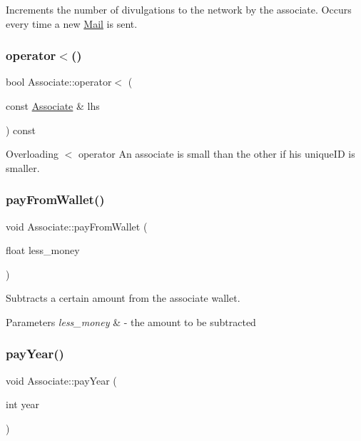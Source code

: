 Increments the number of divulgations to the network by the associate. Occurs every time a new \hyperlink{classMail}{Mail} is sent. 

\mbox{\label{classAssociate_a169cbe6746295386254610c7c9811085}} 
\subsubsection{\texorpdfstring{operator$<$()}{operator<()}}
{\footnotesize\ttfamily bool Associate\+::operator$<$ (\begin{DoxyParamCaption}\item[{const \hyperlink{classAssociate}{Associate} \&}]{lhs }\end{DoxyParamCaption}) const}



Overloading $<$ operator An associate is small than the other if his unique\+ID is smaller. 

\mbox{\label{classAssociate_a81f6e7e09ce00a9bf2a805d47d542b90}} 
\subsubsection{\texorpdfstring{pay\+From\+Wallet()}{payFromWallet()}}
{\footnotesize\ttfamily void Associate\+::pay\+From\+Wallet (\begin{DoxyParamCaption}\item[{float}]{less\+\_\+money }\end{DoxyParamCaption})}



Subtracts a certain amount from the associate wallet. 


\begin{DoxyParams}{Parameters}
{\em less\+\_\+money} & -\/ the amount to be subtracted \\
\hline
\end{DoxyParams}
\mbox{\label{classAssociate_ac5d76c7a552e5ad9149fc968511532bf}} 
\subsubsection{\texorpdfstring{pay\+Year()}{payYear()}}
{\footnotesize\ttfamily void Associate\+::pay\+Year (\begin{DoxyParamCaption}\item[{int}]{year }\end{DoxyParamCaption})}



